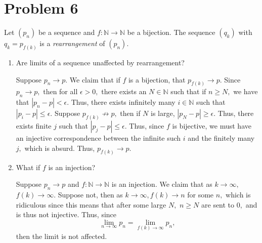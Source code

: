 \documentclass[11pt]{article}
\newcommand{\bbN}{\mathbb{N}}
\begin{document}
\section*{Problem 6}
Let $(p_n)$ be a sequence and $f: \bbN \to \bbN$ be a bijection. The sequence $(q_{k})$ with $q_k = p_{f(k)}$ is a \textit{rearrangement} of $(p_n).$
\begin{enumerate}
    \item 
    \begin{problem}
        Are limits of a sequence unaffected by rearrangement?
    \end{problem}
    \begin{solution}
        Suppose $p_n \to p.$ We claim that if $f$ is a bijection, that $p_{f(k)}\to p.$ Since $p_n \to p,$ then for all $\epsilon>0,$ there exists an $N\in \bbN$ such that if $n\geq N,$ we have that $|p_n - p|<\epsilon.$ Thus, there exists infinitely many $i\in \bbN$ such that $|p_i - p|\leq \epsilon.$ 
        Suppose $p_{f(k)}\not \to p,$ then if $N$ is large, $|p_N - p|\geq \epsilon.$ Thus, there exists finite $j$ such that $|p_j - p|\leq \epsilon.$ Thus, since $f$ is bijective, we must have an injective correspondence between the infinite such $i$ and the finitely many $j,$ which is absurd. Thus, $p_{f(k)}\to p.$
    \end{solution}
    \item 
    \begin{problem}
        What if $f$ is an injection?
    \end{problem}
    \begin{solution}
        Suppose $p_n \to p$ and $f: \bbN \to \bbN$ is an injection. We claim that as $k\to \infty,$  $f(k)\to \infty.$ Suppose not, then as $k\to \infty, f(k)\to n$ for some $n,$ which is ridiculous since this means that after some large $N,$ $n\geq N$ are sent to $0,$ and is thus not injective. Thus, since \[\lim_{n\to \infty}p_n = \lim_{f(k)\to \infty}p_n,\] then the limit is not affected.\\
        

\end{solution}
\end{enumerate}
\end{document}
